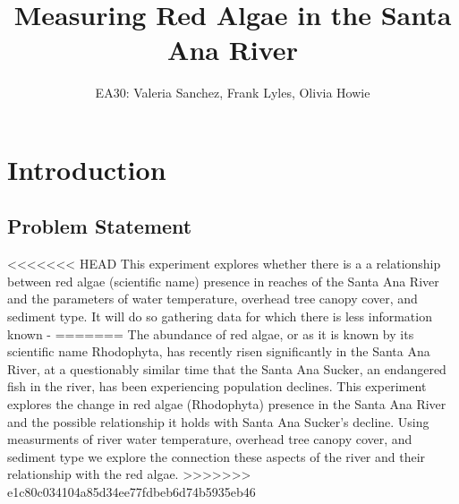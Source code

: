 \documentclass{article}\usepackage[]{graphicx}\usepackage[]{color}
\title{Measuring Red Algae in the Santa Ana River}
\author{EA30: Valeria Sanchez, Frank Lyles, Olivia Howie}
\begin{document}


\maketitle

\newpage
\tableofcontents
\newpage

\section{Introduction}


\subsection{Problem Statement}
<<<<<<< HEAD
This experiment explores whether there is a a relationship between red algae (scientific name) presence in reaches of the Santa Ana River
and the parameters of water temperature, overhead tree canopy cover, and sediment type. It will do so gathering data for which there is less information known - 
=======
The abundance of red algae, or as it is known by its scientific name Rhodophyta, has recently risen significantly in the Santa Ana River, at a questionably similar time that the Santa Ana Sucker, an endangered fish in the river, has been experiencing population declines. This experiment explores the change in red algae (Rhodophyta) presence in the Santa Ana River and the possible relationship it holds with Santa Ana Sucker's decline. Using measurments of river water temperature, overhead tree canopy cover, and sediment type we explore the connection these aspects of the river and their relationship with the red algae.
>>>>>>> e1c80c034104a85d34ee77fdbeb6d74b5935eb46
\end{document}
